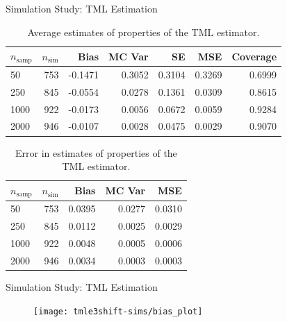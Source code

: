 \documentclass{beamer}
\begin{document}
\begin{frame}[c]{Simulation Study: TML Estimation}

\begin{center}
\begin{table}
\begin{tabular}{l|r|r|r|r|r|r}
\hline
$n_{\text{samp}}$ & $n_{\text{sim}}$ & Bias & MC Var & SE & MSE & Coverage\\
\hline
50 & 753 & -0.1471 & 0.3052 & 0.3104 & 0.3269 & 0.6999\\
\hline
250 & 845 & -0.0554 & 0.0278 & 0.1361 & 0.0309 & 0.8615\\
\hline
1000 & 922 & -0.0173 & 0.0056 & 0.0672 & 0.0059 & 0.9284\\
\hline
2000 & 946 & -0.0107 & 0.0028 & 0.0475 & 0.0029 & 0.9070\\
\hline
\end{tabular}
\caption{Average estimates of properties of the TML estimator.}
\end{table}

\vspace{-0.5em}

\begin{table}
\begin{tabular}{l|r|r|r|r}
\hline
$n_{\text{samp}}$ & $n_{\text{sim}}$ & Bias & MC Var & MSE \\
\hline
50 & 753 & 0.0395 & 0.0277 & 0.0310\\
\hline
250 & 845 & 0.0112 & 0.0025 & 0.0029\\
\hline
1000 & 922 & 0.0048 & 0.0005 & 0.0006\\
\hline
2000 & 946 & 0.0034 & 0.0003 & 0.0003\\
\hline
\end{tabular}
\caption{Error in estimates of properties of the TML estimator.}
\end{table}
\end{center}

\note{
}

\end{frame}


\begin{frame}[c]{Simulation Study: TML Estimation}

\vspace{-0.45em}
\begin{figure}\label{fig:tmle3shift-bias}
  \centering
  \texttt{[image: tmle3shift-sims/bias\_plot]}
\end{figure}

\note{
}

\end{frame}
\end{document}
